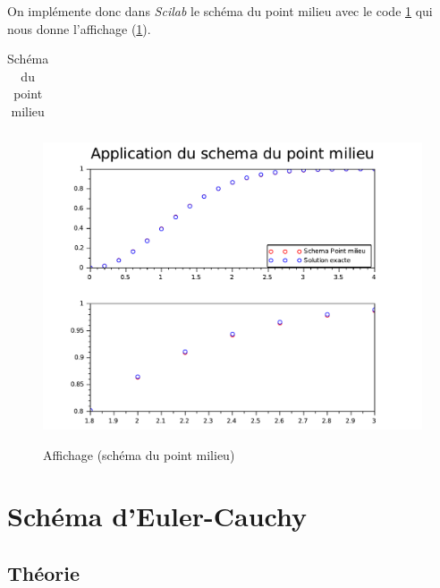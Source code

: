 \documentclass[a4paper,10pt]{report}
\begin{document}
On implémente donc dans \textit{Scilab} le schéma du point milieu avec le code \ref{code_pointmilieu} qui nous donne l'affichage (\ref{graph_pointmilieu}).
\begin{table}[H]
\caption{Schéma du point milieu}
\begin{tabular}{l}

\label{code_pointmilieu}
\end{tabular}
\end{table}

\begin{figure}[H]
\centering
\caption{Affichage (schéma du point milieu)}
\includegraphics[width=\textwidth]{point-milieu.pdf}
\label{graph_pointmilieu}
\end{figure}

\section{Schéma d'Euler-Cauchy}
\subsection{Théorie}
\end{document}
